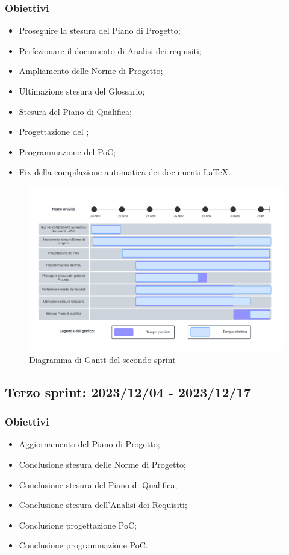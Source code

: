 \subsubsection{Obiettivi}
\begin{itemize}[itemsep=-2pt]
    \item Proseguire la stesura del Piano di Progetto;
    \item Perfezionare il documento di Analisi dei requisiti;
    \item Ampliamento delle Norme di Progetto;
    \item Ultimazione stesura del Glossario;
    \item Stesura del Piano di Qualifica;
    \item Progettazione del ;
    \item Programmazione del PoC;
    \item {} Fix della compilazione automatica dei documenti \LaTeX.
\end{itemize}

\begin{figure}[h!]
    \centering  
    \includegraphics[width=\textwidth]{Roadmap2sprint.png}
    \caption{Diagramma di Gantt del secondo sprint}
    \label{fig:roadmap2s}
\end{figure}
\newpage

\subsection{Terzo sprint: 2023/12/04 - 2023/12/17}
\subsubsection{Obiettivi}
\begin{itemize}[itemsep=-2pt]
    \item Aggiornamento del Piano di Progetto;
    \item Conclusione stesura delle Norme di Progetto;
    \item Conclusione stesura del Piano di Qualifica;
    \item Conclusione stesura dell'Analisi dei Requisiti;
    \item Conclusione progettazione PoC;
    \item Conclusione programmazione PoC.
\end{itemize}


